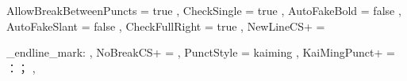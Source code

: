 \xeCJKsetup
  {
	  AllowBreakBetweenPuncts = true ,
	  CheckSingle             = true ,
	  AutoFakeBold            = false ,
	  AutoFakeSlant           = false ,
	  CheckFullRight          = true ,
	  NewLineCS+              = \mxendarticle \item \mnitem
	  \maoxuan_endline_mark: , %
	  NoBreakCS+              = \mnote ,
	  PunctStyle              = kaiming ,
	  KaiMingPunct+           = ：； ,
  }
